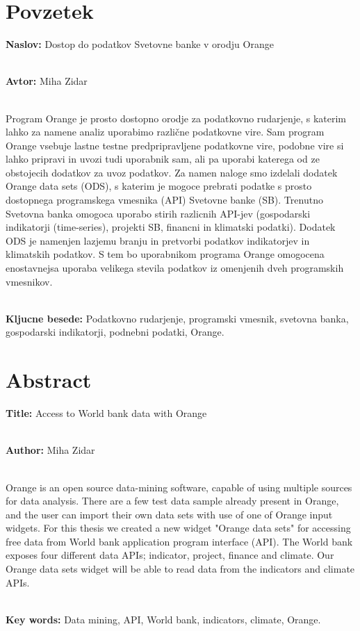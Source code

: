 \chapter*{Povzetek}


\textbf{Naslov:} Dostop do podatkov Svetovne banke v orodju Orange

\ \\
\textbf{Avtor:} Miha Zidar

\ \\
Program Orange je prosto dostopno orodje za podatkovno rudarjenje, s katerim
lahko za namene analiz uporabimo različne podatkovne vire. Sam program Orange
vsebuje lastne testne predpripravljene podatkovne vire, podobne vire si lahko 
pripravi in uvozi tudi uporabnik sam, ali pa uporabi katerega od ze obstojecih
dodatkov za uvoz podatkov. Za namen naloge smo izdelali dodatek Orange data sets (ODS),
s katerim je mogoce prebrati podatke s prosto dostopnega programskega vmesnika 
(API) Svetovne banke (SB). Trenutno Svetovna banka omogoca uporabo stirih razlicnih API-jev
(gospodarski indikatorji (time-series), projekti SB, financni in klimatski podatki). Dodatek ODS
je namenjen lazjemu branju in pretvorbi podatkov indikatorjev in klimatskih podatkov.
S tem bo uporabnikom programa Orange omogocena enostavnejsa uporaba velikega stevila
podatkov iz omenjenih dveh programskih vmesnikov.

\ \\
\textbf{Kljucne besede:} Podatkovno rudarjenje, programski vmesnik, 
svetovna banka, gospodarski indikatorji, podnebni podatki, Orange. 




\clearemptydoublepage

\chapter*{Abstract}


\textbf{Title:} Access to World bank data with Orange

\ \\
\textbf{Author:} Miha Zidar

\ \\
Orange is an open source data-mining software, capable of using multiple
sources for data analysis. There are a few test data sample already present
in Orange, and the user can import their own data sets with use of one of
Orange input widgets. For this thesis we created a new widget "Orange data sets"
for accessing free data from World bank application program interface (API).
The World bank exposes four different data APIs; indicator, project, finance
and climate. Our Orange data sets widget will be able to read data from the
indicators and climate APIs.


\ \\
\textbf{Key words:} Data mining, API, World bank, indicators, climate, Orange.

